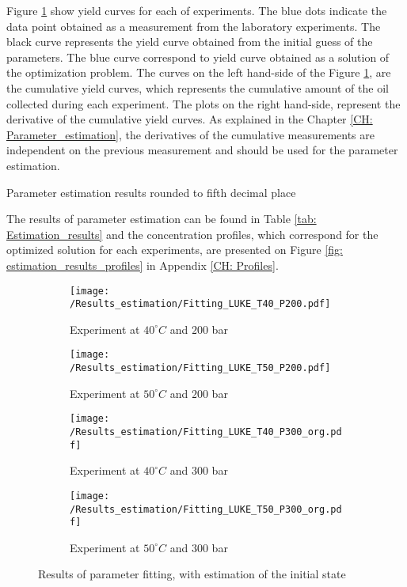 \documentclass[../Article_Model_Parameters.tex]{subfiles}
\begin{document}
	Figure \ref{fig: estimation_results} show yield curves for each of experiments. The blue dots indicate the data point obtained as a measurement from the laboratory experiments. The black curve represents the yield curve obtained from the initial guess of the parameters. The blue curve correspond to yield curve obtained as a solution of the optimization problem. The curves on the left hand-side of the Figure \ref{fig: estimation_results}, are the cumulative yield curves, which represents the cumulative amount of the oil collected during each experiment. The plots on the right hand-side, represent the derivative of the cumulative yield curves. As explained in the Chapter \ref{CH: Parameter_estimation}, the derivatives of the cumulative measurements are independent on the previous measurement and should be used for the parameter estimation.

	\begin{table}[!h]
		\centering
		\caption{Parameter estimation results rounded to fifth decimal place}
		\label{tab: Estimation_results}
	\end{table}

	The results of parameter estimation can be found in Table \ref{tab: Estimation_results} and the concentration profiles, which correspond for the optimized solution for each experiments, are presented on Figure \ref{fig: estimation_results_profiles} in Appendix \ref{CH: Profiles}.
	
	\begin{figure}[!h]
		\centering
		\begin{subfigure}[b]{\columnwidth}
			\centering
			\texttt{[image: /Results\_estimation/Fitting\_LUKE\_T40\_P200.pdf]}
			\caption{Experiment at $40^\circ C$ and $200$ bar}
		\end{subfigure}
		\begin{subfigure}[b]{\columnwidth}
			\centering
			\texttt{[image: /Results\_estimation/Fitting\_LUKE\_T50\_P200.pdf]}
			\caption{Experiment at $50^\circ C$ and $200$ bar}
		\end{subfigure}
		\hfill
		\begin{subfigure}[b]{\columnwidth}
			\centering
			\texttt{[image: /Results\_estimation/Fitting\_LUKE\_T40\_P300\_org.pdf]}
			\caption{Experiment at $40^\circ C$ and $300$ bar}
		\end{subfigure}
		\begin{subfigure}[b]{\columnwidth}
			\centering
			\texttt{[image: /Results\_estimation/Fitting\_LUKE\_T50\_P300\_org.pdf]}
			\caption{Experiment at $50^\circ C$ and $300$ bar}
		\end{subfigure}
		\caption{Results of parameter fitting, with estimation of the initial state}
		\label{fig: estimation_results}
	\end{figure}
	
\end{document}
